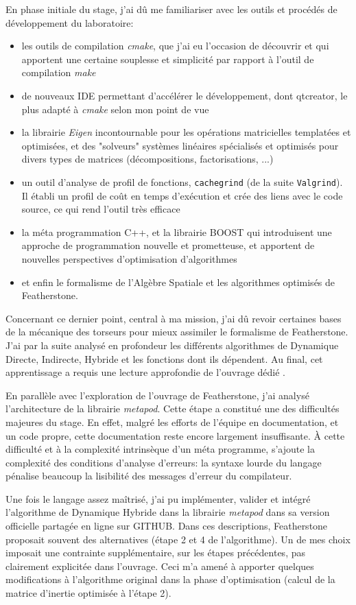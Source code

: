 \documentclass{report}
\begin{document}
En phase initiale du stage, j'ai dû me familiariser avec les outils et procédés de développement du laboratoire:
\begin{itemize}
\item les outils de compilation \emph{cmake}, que j'ai eu l'occasion de découvrir et qui apportent une certaine souplesse et simplicité par rapport à l'outil de compilation \emph{make}
\item de nouveaux IDE permettant d'accélérer le développement, dont qtcreator, le plus adapté à \emph{cmake} selon mon point de vue
\item la librairie \emph{Eigen} incontournable pour les opérations matricielles templatées et optimisées, et des "solveurs" systèmes linéaires spécialisés et optimisés pour divers types de matrices (décompositions, factorisations, ...)
\item un outil d'analyse de profil de fonctions, \verb;cachegrind; (de la suite \verb;Valgrind;). Il établi un profil de coût en temps d'exécution et crée des liens avec le code source, ce qui rend l'outil très efficace
\item la méta programmation C++, et la librairie BOOST qui introduisent une approche de programmation nouvelle et prometteuse, et apportent de nouvelles perspectives d'optimisation d'algorithmes
\item et enfin le formalisme de l'Algèbre Spatiale et les algorithmes optimisés de Featherstone.
\end{itemize}
Concernant ce dernier point, central à ma mission, j'ai dû revoir certaines bases de la mécanique des torseurs pour mieux assimiler le formalisme de Featherstone. J'ai par la suite analysé en profondeur les différents algorithmes de Dynamique Directe, Indirecte, Hybride et les fonctions dont ils dépendent. Au final, cet apprentissage a requis une lecture approfondie de l'ouvrage dédié \cite{bib_featherstone}.

En parallèle avec l'exploration de l'ouvrage de Featherstone, j'ai analysé l'architecture de la librairie \emph{metapod}. Cette étape a constitué une des difficultés majeures du stage. En effet, malgré les efforts de l'équipe en documentation, et un code propre, cette documentation reste encore largement insuffisante. \`{A} cette difficulté et à la complexité intrinsèque d'un méta programme, s'ajoute la complexité des conditions d'analyse d'erreurs: la syntaxe lourde du langage pénalise beaucoup la lisibilité des messages d'erreur du compilateur.

Une fois le langage assez maîtrisé, j'ai pu implémenter, valider et intégré l'algorithme de Dynamique Hybride dans la librairie \emph{metapod} dans sa version officielle partagée en ligne sur GITHUB. Dans ces descriptions, Featherstone proposait souvent des alternatives (étape 2 et 4 de l'algorithme). Un de mes choix imposait une contrainte supplémentaire, sur les étapes précédentes, pas clairement explicitée dans l'ouvrage. Ceci m'a amené à apporter quelques modifications à l'algorithme original dans la phase d'optimisation (calcul de la matrice d'inertie optimisée à l'étape 2).
\end{document}
